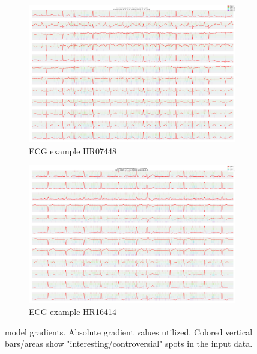 \begin{figure}
	\begin{subfigure}{1\textwidth}\centering
		\includegraphics[width=\linewidth]{"bilder/HR07448-class:[4, 16, 33, 41]-gradient-cambl11.png"}
		\caption{ECG example HR07448}
		\centering
	\end{subfigure}
	\begin{subfigure}{1\textwidth}\centering
		\includegraphics[width=\linewidth]{"bilder/HR16414-class:[3, 6, 7, 41]-gradient-cambl11.png"}
		\caption{ECG example HR16414}
		\centering
	\end{subfigure}
	\caption{ model gradients. Absolute gradient values utilized. Colored vertical bars/areas show "interesting/controversial" spots in the input data.}
	\label{explain-bl}
\end{figure}
